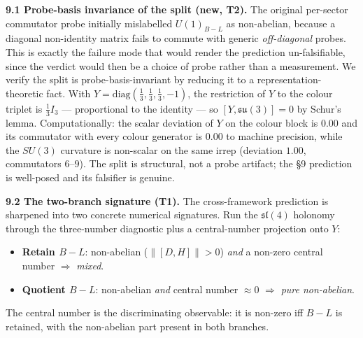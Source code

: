 \documentclass[11pt]{article}
\begin{document}
\textbf{9.1 Probe-basis invariance of the split (new, T2).} The original per-sector commutator probe initially mislabelled $U(1)_{B-L}$ as non-abelian, because a diagonal non-identity matrix fails to commute with generic \emph{off-diagonal} probes. This is exactly the failure mode that would render the prediction un-falsifiable, since the verdict would then be a choice of probe rather than a measurement. We verify the split is probe-basis-invariant by reducing it to a representation-theoretic fact. With $Y=\mathrm{diag}(\tfrac13,\tfrac13,\tfrac13,-1)$, the restriction of $Y$ to the colour triplet is $\tfrac13 I_3$ --- proportional to the identity --- so $[Y,\mathfrak{su}(3)]=0$ by Schur's lemma. Computationally: the scalar deviation of $Y$ on the colour block is $\mathbf{0.00}$ and its commutator with every colour generator is $\mathbf{0.00}$ to machine precision, while the $SU(3)$ curvature is non-scalar on the same irrep (deviation $1.00$, commutators $6$--$9$). The split is structural, not a probe artifact; the \S9 prediction is well-posed and its falsifier is genuine.

\textbf{9.2 The two-branch signature (T1).} The cross-framework prediction is sharpened into two concrete numerical signatures. Run the $\mathfrak{sl}(4)$ holonomy through the three-number diagnostic plus a central-number projection onto $Y$:
\begin{itemize}[nosep]
\item \textbf{Retain $B\!-\!L$}: non-abelian ($\|[D,H]\|>0$) \emph{and} a non-zero central number $\Rightarrow$ \emph{mixed}.
\item \textbf{Quotient $B\!-\!L$}: non-abelian \emph{and} central number $\approx0$ $\Rightarrow$ \emph{pure non-abelian}.
\end{itemize}
The central number is the discriminating observable: it is non-zero iff $B\!-\!L$ is retained, with the non-abelian part present in both branches.
\end{document}
